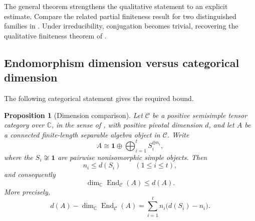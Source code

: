 \documentclass[11pt]{amsart}
\newtheorem{proposition}[theorem]{Proposition}
\theoremstyle{definition}
\theoremstyle{remark}
\newcommand{\C}{\mathcal C}
\newcommand{\one}{\mathbf 1}
\newcommand{\CC}{\mathbb C}
\DeclareMathOperator{\End}{End}
\begin{document}
The general theorem strengthens the qualitative statement to an
explicit estimate.  Compare the related partial finiteness result for
two distinguished families in \cite{KhoshkamMashood}.  Under
irreducibility, conjugation becomes trivial, recovering the qualitative
finiteness theorem of \cite{WatataniLattices}.

\subsection{Endomorphism dimension versus categorical dimension}

The following categorical statement gives the required bound.

\begin{proposition}[Dimension comparison]\label{prop:dimension-comparison}
Let $\C$ be a positive semisimple tensor category over $\CC$, in the sense
of \cite[Definition~6.3]{GhoshPalcouxLattices}, with positive pivotal
dimension $d$, and let $A$ be a connected finite-length separable algebra
object in $\C$.  Write
\begin{equation}\label{eq:algebra-decomposition-dimension}
 A\cong\one\oplus\bigoplus_{i=1}^t S_i^{\oplus n_i},
\end{equation}
where the $S_i\not\cong\one$ are pairwise nonisomorphic simple objects.
Then
\begin{equation}\label{eq:multiplicity-dimension}
 n_i\leq d(S_i)\qquad(1\leq i\leq t),
\end{equation}
and consequently
\begin{equation}\label{eq:end-less-dimension}
 \dim_{\CC}\End_{\C}(A)\leq d(A).
\end{equation}
More precisely,
\begin{equation}\label{eq:categorical-defect}
 d(A)-\dim_{\CC}\End_{\C}(A)
 =\sum_{i=1}^t n_i\bigl(d(S_i)-n_i\bigr).
\end{equation}
\end{proposition}
\end{document}
